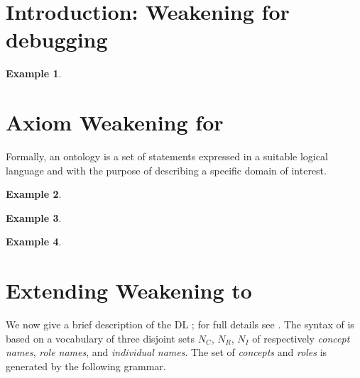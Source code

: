 \documentclass[
]{ceurart}
\newtheorem{example}{Example}
\begin{document}
\section{Introduction: Weakening for debugging}


\begin{example}
\end{example}


\section{Axiom Weakening for \ALC}

Formally, an ontology is a set of statements expressed in a suitable logical language and with the purpose of describing a specific domain of interest. 



\begin{example}
\end{example}


\begin{example}
\end{example}


\begin{example}
\end{example}

\section{Extending Weakening to \SROIQ}

We now give a brief description of the DL \SROIQ; for full details see \cite{baader_horrocks_lutz_sattler_2017,HorrocksKutzSattlerKR2006}. The syntax of \SROIQ is based on a vocabulary of three disjoint sets $N_C$, $N_R$, $N_I$ of respectively \emph{concept names}, \emph{role names}, and \emph{individual names}. The set of \SROIQ \emph{concepts} and \emph{roles} is generated by the following grammar.
\end{document}
